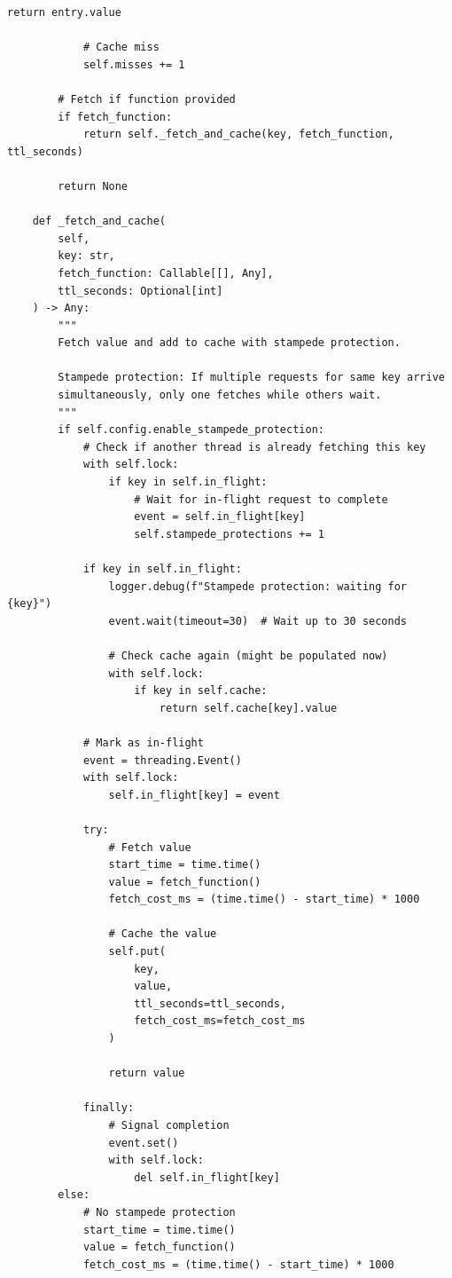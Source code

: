 \begin{lstlisting}[style=python, caption={Cache Manager with Intelligent Eviction}]
                    return entry.value

            # Cache miss
            self.misses += 1

        # Fetch if function provided
        if fetch_function:
            return self._fetch_and_cache(key, fetch_function, ttl_seconds)

        return None

    def _fetch_and_cache(
        self,
        key: str,
        fetch_function: Callable[[], Any],
        ttl_seconds: Optional[int]
    ) -> Any:
        """
        Fetch value and add to cache with stampede protection.

        Stampede protection: If multiple requests for same key arrive
        simultaneously, only one fetches while others wait.
        """
        if self.config.enable_stampede_protection:
            # Check if another thread is already fetching this key
            with self.lock:
                if key in self.in_flight:
                    # Wait for in-flight request to complete
                    event = self.in_flight[key]
                    self.stampede_protections += 1

            if key in self.in_flight:
                logger.debug(f"Stampede protection: waiting for {key}")
                event.wait(timeout=30)  # Wait up to 30 seconds

                # Check cache again (might be populated now)
                with self.lock:
                    if key in self.cache:
                        return self.cache[key].value

            # Mark as in-flight
            event = threading.Event()
            with self.lock:
                self.in_flight[key] = event

            try:
                # Fetch value
                start_time = time.time()
                value = fetch_function()
                fetch_cost_ms = (time.time() - start_time) * 1000

                # Cache the value
                self.put(
                    key,
                    value,
                    ttl_seconds=ttl_seconds,
                    fetch_cost_ms=fetch_cost_ms
                )

                return value

            finally:
                # Signal completion
                event.set()
                with self.lock:
                    del self.in_flight[key]
        else:
            # No stampede protection
            start_time = time.time()
            value = fetch_function()
            fetch_cost_ms = (time.time() - start_time) * 1000


\end{lstlisting}
